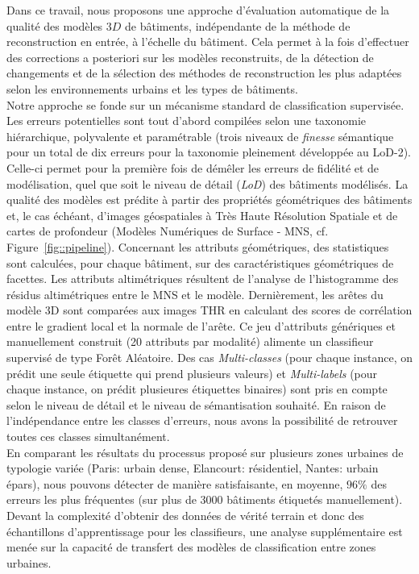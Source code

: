 \documentclass[a4paper,french]{article}
\begin{document}
    Dans ce travail, nous proposons une approche d'évaluation automatique de la qualité des modèles $3D$ de bâtiments, indépendante de la méthode de reconstruction en entrée, à l'échelle du bâtiment. Cela permet à la fois d'effectuer des corrections a posteriori sur les modèles reconstruits, de la détection de changements et de la sélection des méthodes de reconstruction les plus adaptées selon les environnements urbains et les types de bâtiments.\\

    Notre approche se fonde sur un mécanisme standard de classification supervisée. Les erreurs potentielles sont tout d'abord compilées selon une taxonomie hiérarchique, polyvalente et paramétrable (trois niveaux de \textit{finesse} sémantique pour un total de dix erreurs pour la taxonomie pleinement développée au LoD-2). Celle-ci permet pour la première fois de démêler les erreurs de fidélité et de modélisation, quel que soit le niveau de détail (\textit{LoD}) des bâtiments modélisés. La qualité des modèles est prédite à partir des propriétés géométriques des bâtiments et, le cas échéant, d'images géospatiales à Très Haute Résolution Spatiale et de cartes de profondeur (Modèles Numériques de Surface - MNS, cf. Figure~\ref{fig::pipeline}). Concernant les attributs géométriques, des statistiques sont calculées, pour chaque bâtiment, sur des caractéristiques géométriques de facettes. Les attributs altimétriques résultent de l'analyse de l'histogramme des résidus altimétriques entre le MNS et le modèle. Dernièrement, les arêtes du modèle 3D sont comparées aux images THR en calculant des scores de corrélation entre le gradient local et la normale de l'arête. Ce jeu d'attributs génériques et manuellement construit (20 attributs par modalité) alimente un classifieur supervisé de type Forêt Aléatoire. Des cas \textit{Multi-classes} (pour chaque instance, on prédit une seule étiquette qui prend plusieurs valeurs) et \textit{Multi-labels} (pour chaque instance, on prédit plusieures étiquettes binaires) sont pris en compte selon le niveau de détail et le niveau de sémantisation souhaité. En raison de l'indépendance entre les classes d'erreurs, nous avons la possibilité de retrouver toutes ces classes simultanément. \\
        
    En comparant les résultats du processus proposé sur plusieurs zones urbaines de typologie variée (Paris: urbain dense, Elancourt: résidentiel, Nantes: urbain épars), nous pouvons détecter de manière satisfaisante, en moyenne, $96\%$ des erreurs les plus fréquentes (sur plus de 3000 bâtiments étiquetés manuellement). Devant la complexité d'obtenir des données de vérité terrain et donc des échantillons d'apprentissage pour les classifieurs, une analyse supplémentaire est menée sur la capacité de transfert des modèles de classification entre zones urbaines.\\

    
    \begin{spacing}{0.01}
        
    \end{spacing}
    
\end{document}
